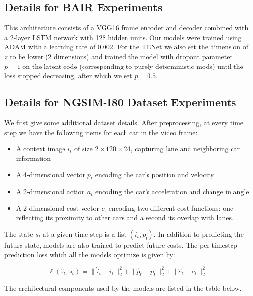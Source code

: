 \documentclass{article}
\newcommand{\modelname}{TENet }
\begin{document}
\begin{appendices}
\subsection{Details for BAIR Experiments}
\label{bair-details}

This architecture consists of a VGG16 frame encoder and decoder combined with a 2-layer LSTM network with 128 hidden units.
Our models were trained using ADAM \citep{ADAM} with a learning rate of 0.002.
For the \modelname we also set the dimension of $z$ to be lower (2 dimensions) and trained the model with dropout parameter $p=1$ on the latent code (corresponding to purely deterministic mode) until the loss stopped decreasing, after which we set $p=0.5$.




\subsection{Details for NGSIM-I80 Dataset Experiments}

We first give some additional dataset details.
After preprocessing, at every time step we have the following items for each car in the video frame:


\begin{itemize}
\item A context image $i_t$ of size $2 \times 120 \times 24$, capturing lane and neighboring car information
\item A 4-dimensional vector $p_t$ encoding the car's position and velocity
\item A 2-dimensional action $a_t$ encoding the car's acceleration and change in angle
\item A 2-dimensional cost vector $c_t$ encoding two different cost functions: one reflecting its proximity to other cars and a second its overlap with lanes.
\end{itemize}

The state $s_t$ at a given time step is a list $(i_t, p_t)$.
In addition to predicting the future state, models are also trained to predict future costs.
The per-timestep prediction loss which all the models optimize is given by:

\begin{equation}
\ell(\hat{s}_t, s_t) = \|\hat{i}_t - i_t \|_2^2 + \| \hat{p}_t - p_t \|_2^2 + \| \hat{c}_t - c_t \|_2^2
\end{equation}

The architectural components used by the models are listed in the table below.


\end{appendices}
\end{document}
